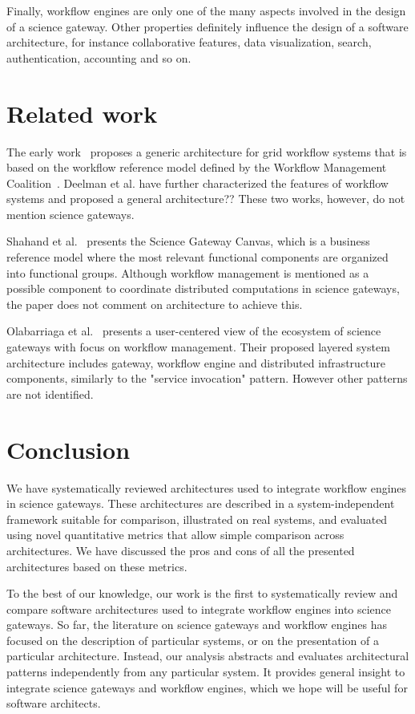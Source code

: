 \documentclass[preprint,3p,twocolumn]{elsarticle}
\begin{document}
Finally, workflow engines are only one of the many aspects involved in
the design of a science gateway. Other properties definitely influence
the design of a software architecture, for instance collaborative
features, data visualization, search, authentication, accounting and
so on.

\section{Related work}
\label{sec:related}
 
The early work~\cite{yuTaxonomy} proposes a generic architecture for
grid workflow systems that is based on the workflow reference model
defined by the Workflow Management Coalition~\cite{wfRefModel}.
Deelman et al. \cite{deelman2009workflows} have further characterized
the features of workflow systems and proposed a general architecture??
These two works, however, do not mention science gateways.

Shahand et al.~\cite{shahand:2015ab} presents the Science Gateway
Canvas, which is a business reference model where the most relevant
functional components are organized into functional groups. Although
workflow management is mentioned as a possible component to coordinate
distributed computations in science gateways, the paper does not
comment on architecture to achieve this.

Olabarriaga et al.~\cite{olabarriaga2014} presents a user-centered
view of the ecosystem of science gateways with focus on workflow
management. Their proposed layered system architecture includes
gateway, workflow engine and distributed infrastructure components,
similarly to the "service invocation" pattern. However other patterns
are not identified.

\section{Conclusion}

We have systematically reviewed architectures used to integrate workflow engines in
science gateways. These architectures are described in a system-independent framework
suitable for comparison, illustrated on real systems, and evaluated using novel quantitative metrics that allow simple comparison across architectures. We have discussed the
pros and cons of all the presented architectures based on these metrics.

To the best of our knowledge, our work is the first to systematically
review and compare software architectures used to integrate workflow
engines into science gateways. So far, the literature on science gateways and
workflow engines has focused on the description of particular systems,
or on the presentation of a particular architecture.  Instead, our
analysis abstracts and evaluates architectural patterns independently
from any particular system. It provides general insight to integrate
science gateways and workflow engines, which we hope will be useful
for software architects.
\end{document}
